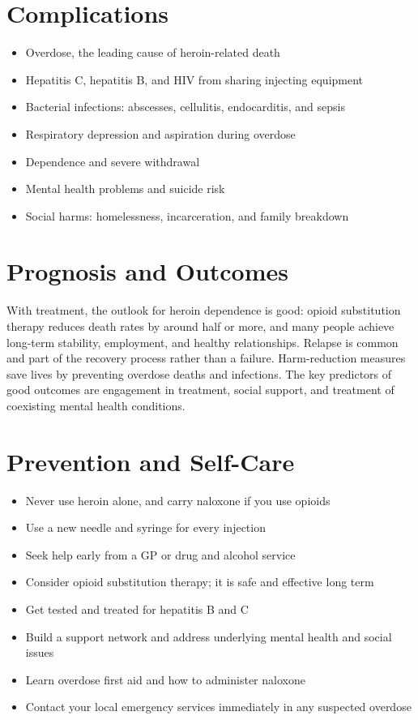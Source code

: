 \section*{Complications}
\begin{itemize}
    \item Overdose, the leading cause of heroin-related death
    \item Hepatitis C, hepatitis B, and HIV from sharing injecting equipment
    \item Bacterial infections: abscesses, cellulitis, endocarditis, and sepsis
    \item Respiratory depression and aspiration during overdose
    \item Dependence and severe withdrawal
    \item Mental health problems and suicide risk
    \item Social harms: homelessness, incarceration, and family breakdown
\end{itemize}

\section*{Prognosis and Outcomes}
With treatment, the outlook for heroin dependence is good: opioid substitution therapy reduces death rates by around half or more, and many people achieve long-term stability, employment, and healthy relationships. Relapse is common and part of the recovery process rather than a failure. Harm-reduction measures save lives by preventing overdose deaths and infections. The key predictors of good outcomes are engagement in treatment, social support, and treatment of coexisting mental health conditions.

\section*{Prevention and Self-Care}
\begin{itemize}
    \item Never use heroin alone, and carry naloxone if you use opioids
    \item Use a new needle and syringe for every injection
    \item Seek help early from a GP or drug and alcohol service
    \item Consider opioid substitution therapy; it is safe and effective long term
    \item Get tested and treated for hepatitis B and C
    \item Build a support network and address underlying mental health and social issues
    \item Learn overdose first aid and how to administer naloxone
    \item Contact your local emergency services immediately in any suspected overdose
\end{itemize}

